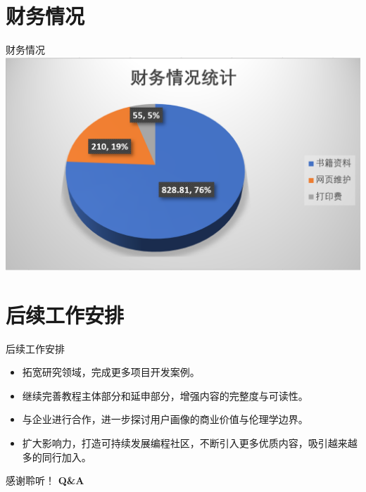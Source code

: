 \documentclass[10pt,aspectratio=32,handout]{beamer}
\begin{document}
\section{财务情况}
  \begin{frame}{财务情况}
  \includegraphics[height=0.66\paperheight]{finance}
  \end{frame}


\section{后续工作安排}
\begin{frame}{后续工作安排}
  \begin{itemize}
    \item 拓宽研究领域，完成更多项目开发案例。\newline
    \item 继续完善教程主体部分和延申部分，增强内容的完整度与可读性。\newline
    \item 与企业进行合作，进一步探讨用户画像的商业价值与伦理学边界。\newline
    \item 扩大影响力，打造可持续发展编程社区，不断引入更多优质内容，吸引越来越多的同行加入。
  \end{itemize}

\end{frame}


\begin{frame}
感谢聆听！\newline\newline
\textbf{Q\&A}
\end{frame}
\end{document}
